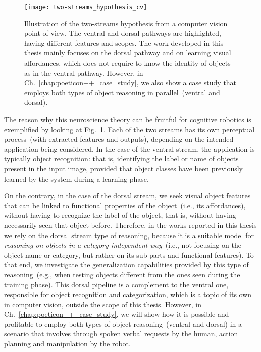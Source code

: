 \begin{figure}
\centering
\texttt{[image: two-streams\_hypothesis\_cv]}
\caption[Illustration of the two-streams hypothesis from a computer vision point of view.]{Illustration of the two-streams hypothesis from a computer vision point of view.
The ventral and dorsal pathways are highlighted, having different features and scopes.
The work developed in this thesis mainly focuses on the dorsal pathway and on learning visual affordances, which does not require to know the identity of objects as in the ventral pathway.
However, in Ch.~\ref{chap:poeticon++_case_study}, we also show a case study that employs both types of object reasoning in parallel~(ventral and dorsal).}
\label{fig:two-streams_cv}
\end{figure}

The reason why this neuroscience theory can be fruitful for cognitive robotics is exemplified by looking at Fig.~\ref{fig:two-streams_cv}.
Each of the two streams has its own perceptual process~(with extracted features and outputs), depending on the intended application being considered.
In the case of the ventral stream, the application is typically object recognition: that is, identifying the label or name of objects present in the input image, provided that object classes have been previously learned by the system during a learning phase.

On the contrary, in the case of the dorsal stream, we seek visual object features that can be linked to functional properties of the object~(i.e., its affordances), without having to recognize the label of the object, that is, without having necessarily seen that object before.
Therefore, in the works reported in this thesis we rely on the dorsal stream type of reasoning, because it is a suitable model for \emph{reasoning on objects in a category-independent way}~(i.e., not focusing on the object name or category, but rather on its sub-parts and functional features).
To that end, we investigate the generalization capabilities provided by this type of reasoning~(e.g., when testing objects different from the ones seen during the training phase).
This dorsal pipeline is a complement to the ventral one, responsible for object recognition and categorization, which is a topic of its own in computer vision, outside the scope of this thesis.
However, in Ch.~\ref{chap:poeticon++_case_study}, we will show how it is possible and profitable to employ both types of object reasoning~(ventral and dorsal) in a scenario that involves \hri{} through spoken verbal requests by the human, action planning and manipulation by the robot.

